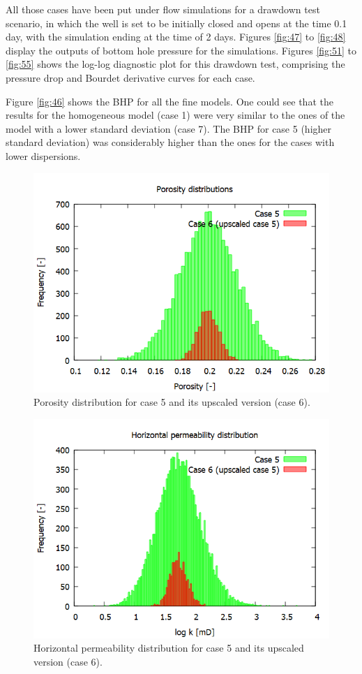 All those cases have been put under flow simulations for a drawdown test scenario, in which the well is set to be initially closed and opens at the time 0.1 day, with the simulation ending at the time of 2 days. Figures \ref{fig:47} to \ref{fig:48} display the outputs of bottom hole pressure for the simulations. Figures \ref{fig:51} to \ref{fig:55} shows the log-log diagnostic plot for this drawdown test, comprising the pressure drop and Bourdet derivative curves for each case. 

Figure \ref{fig:46} shows the BHP for all the fine models. One could see that the results for the homogeneous model (case 1) were very similar to the ones of the model with a lower standard deviation (case 7). The BHP for case 5 (higher standard deviation) was considerably higher than the ones for the cases with lower dispersions.

\begin{figure}[H]
	\centering
	\includegraphics[width=0.8\linewidth]{Images/42}
	\caption{Porosity distribution for case 5 and its upscaled version (case 6).}
	\label{fig:42}
\end{figure}

\begin{figure}[H]
	\centering
	\includegraphics[width=0.8\linewidth]{Images/41}
	\caption{Horizontal permeability distribution for case 5 and its upscaled version (case 6).}
	\label{fig:41}
\end{figure}

